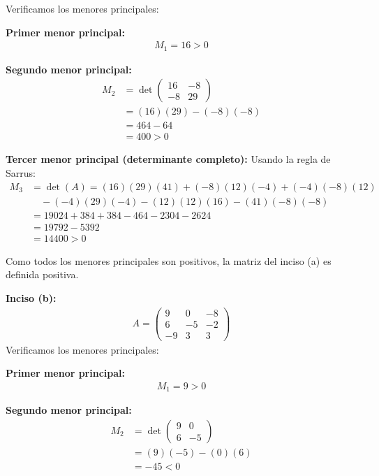 \documentclass{article}
\begin{document}
Verificamos los menores principales:

\textbf{Primer menor principal:}
\begin{align}
M_1 = 16 > 0
\end{align}

\textbf{Segundo menor principal:}
\begin{align}
M_2 &= \det\begin{pmatrix} 16 & -8 \\ -8 & 29 \end{pmatrix} \\
&= (16)(29) - (-8)(-8) \\
&= 464 - 64 \\
&= 400 > 0
\end{align}

\textbf{Tercer menor principal (determinante completo):}
Usando la regla de Sarrus:
\begin{align}
M_3 &= \det(A) = (16)(29)(41) + (-8)(12)(-4) + (-4)(-8)(12) \\
&\quad - (-4)(29)(-4) - (12)(12)(16) - (41)(-8)(-8) \\
&= 19024 + 384 + 384 - 464 - 2304 - 2624 \\
&= 19792 - 5392 \\
&= 14400 > 0
\end{align}

Como todos los menores principales son positivos, la matriz del inciso (a) es definida positiva.

\textbf{Inciso (b):}
\begin{align}
     A=\begin{pmatrix} 9 & 0 & -8\\ 6 & -5 & -2\\ -9 & 3 & 3 \end{pmatrix}
\end{align}
Verificamos los menores principales:

\textbf{Primer menor principal:}
\begin{align}
M_1 = 9 > 0
\end{align}

\textbf{Segundo menor principal:}
\begin{align}
M_2 &= \det\begin{pmatrix} 9 & 0 \\ 6 & -5 \end{pmatrix} \\
&= (9)(-5) - (0)(6) \\
&= -45 < 0
\end{align}
\end{document}
